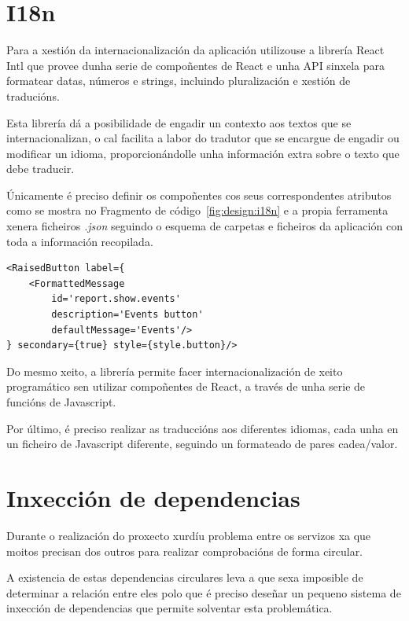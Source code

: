   \section{I18n}
  Para a xestión da internacionalización da aplicación utilizouse a librería 
React Intl que provee dunha serie de compoñentes de React e unha API sinxela 
para formatear datas, números e strings, incluindo pluralización e xestión de 
traducións.

  Esta librería dá a posibilidade de engadir un contexto aos textos que se 
internacionalizan, o cal facilita a labor do tradutor que se encargue de 
engadir ou modificar un idioma, proporcionándolle unha información extra sobre 
o texto que debe traducir.

  Únicamente é preciso definir os compoñentes cos seus correspondentes 
atributos como se mostra no Fragmento de código~\ref{fig:design:i18n} e a 
propia ferramenta xenera 
ficheiros \emph{.json} seguindo o esquema de carpetas e ficheiros da aplicación 
con toda a información recopilada.

    \lstset{}
     \begin{lstlisting}[caption=Exemplo de internacionalización 
na label de un botón., label=fig:design:i18n]
<RaisedButton label={
    <FormattedMessage
        id='report.show.events'
        description='Events button'
        defaultMessage='Events'/>
} secondary={true} style={style.button}/>
    \end{lstlisting}

  Do mesmo xeito, a librería permite facer internacionalización de xeito 
programático sen utilizar compoñentes de React, a través de unha serie de 
funcións de Javascript.

  Por último, é preciso realizar as traduccións aos diferentes idiomas, cada 
unha en un ficheiro de Javascript diferente, seguindo un formateado de 
pares cadea/valor.

  \section{Inxección de dependencias}
  Durante o realización do proxecto xurdíu problema entre os servizos xa que 
moitos precisan dos outros para realizar comprobacións de forma circular.

  A existencia de estas dependencias circulares leva a que sexa imposible de
determinar a relación entre eles polo que é preciso deseñar un pequeno sistema 
de inxección de dependencias que permite solventar esta problemática.

